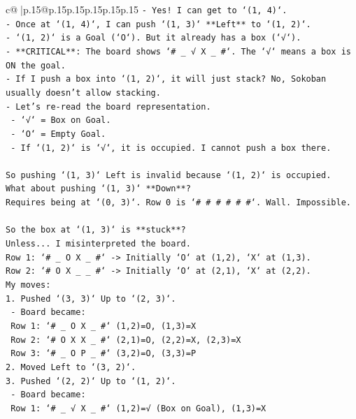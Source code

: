 \documentclass{article}
\begin{document}
{\begin{supertabular}{c@{$\;$}|p{.15\linewidth}@{}p{.15\linewidth}p{.15\linewidth}p{.15\linewidth}p{.15\linewidth}p{.15\linewidth}}
{{{\texttt{{-} Yes! I can get to `(1, 4)`.} \\
\texttt{{-} Once at `(1, 4)`, I can push `(1, 3)` **Left** to `(1, 2)`.} \\
\texttt{{-} `(1, 2)` is a Goal (`O`). But it already has a box (`√`).} \\
\texttt{{-} **CRITICAL**: The board shows `\# \_ √ X \_ \#`. The `√` means a box is ON the goal.} \\
\texttt{{-} If I push a box into `(1, 2)`, it will just stack? No, Sokoban usually doesn't allow stacking.} \\
\texttt{{-} Let's re{-}read the board representation.} \\
\texttt{  {-} `√` = Box on Goal.} \\
\texttt{  {-} `O` = Empty Goal.} \\
\texttt{  {-} If `(1, 2)` is `√`, it is occupied. I cannot push a box there.} \\
\\ 
\texttt{So pushing `(1, 3)` Left is invalid because `(1, 2)` is occupied.} \\
\texttt{What about pushing `(1, 3)` **Down**?} \\
\texttt{Requires being at `(0, 3)`. Row 0 is `\# \# \# \# \# \#`. Wall. Impossible.} \\
\\ 
\texttt{So the box at `(1, 3)` is **stuck**?} \\
\texttt{Unless... I misinterpreted the board.} \\
\texttt{Row 1: `\# \_ O X \_ \#` {-}> Initially `O` at (1,2), `X` at (1,3).} \\
\texttt{Row 2: `\# O X \_ \_ \#` {-}> Initially `O` at (2,1), `X` at (2,2).} \\
\texttt{My moves:} \\
\texttt{1. Pushed `(3, 3)` Up to `(2, 3)`.} \\
\texttt{   {-} Board became:} \\
\texttt{     Row 1: `\# \_ O X \_ \#` (1,2)=O, (1,3)=X} \\
\texttt{     Row 2: `\# O X X \_ \#` (2,1)=O, (2,2)=X, (2,3)=X} \\
\texttt{     Row 3: `\# \_ O P \_ \#` (3,2)=O, (3,3)=P} \\
\texttt{2. Moved Left to `(3, 2)`.} \\
\texttt{3. Pushed `(2, 2)` Up to `(1, 2)`.} \\
\texttt{   {-} Board became:} \\
\texttt{     Row 1: `\# \_ √ X \_ \#` (1,2)=√ (Box on Goal), (1,3)=X} \\
}}}
\end{supertabular}}
\end{document}
